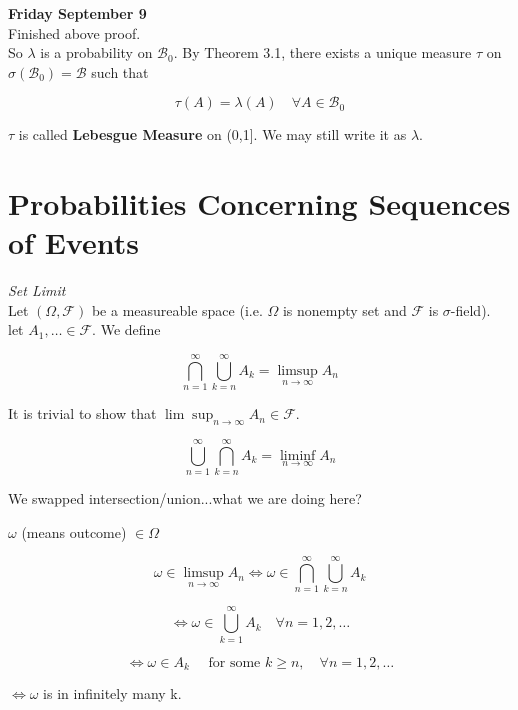 \documentclass[11pt,fleqn]{book} %
\begin{document}
\textbf{Friday September 9}\\

Finished above proof. \\

So $\lambda$ is a probability on $\mathcal{B}_0$. By Theorem 3.1, there exists a unique measure $\tau$ on $\sigma(\mathcal{B}_0) = \mathcal{B}$ such that 

		$$\tau(A) = \lambda(A) \quad \forall A \in \mathcal{B}_0 $$

$\tau$ is called \textbf{Lebesgue Measure} on (0,1]. We may still write it as $\lambda$.






\section{Probabilities Concerning Sequences of Events}

\textit{Set Limit}\\

Let $(\Omega, \mathcal{F})$ be a measureable space (i.e. $\Omega$ is nonempty set and $\mathcal{F}$ is $\sigma$-field). \\

let $A_1, \dots \in \mathcal{F}$. We define 

$$\bigcap^\infty_{n=1} \bigcup^\infty_{k=n} A_k = \limsup_{n\rightarrow \infty} A_n $$

It is trivial to show that $\lim\sup_{n\rightarrow \infty} A_n \in \mathcal{F}$. 


$$ \bigcup^\infty_{n=1} \bigcap^\infty_{k=n} A_k = \liminf_{n\rightarrow \infty} A_n $$

We swapped intersection/union...what we are doing here?

$\omega$ (means outcome) $\in \Omega$

$$\omega \in \limsup_{n \rightarrow \infty} A_n \Leftrightarrow \omega \in \bigcap^\infty_{n=1} \bigcup^\infty_{k=n} A_k$$

$$\Leftrightarrow \omega \in \bigcup^\infty_{k=1} A_k \quad \forall n=1, 2, \dots $$

$$\Leftrightarrow \omega \in A_k \quad \text{ for some }k\geq n, \quad \forall n = 1, 2, \dots $$

$\Leftrightarrow \omega$ is in infinitely many k. 
\end{document}
